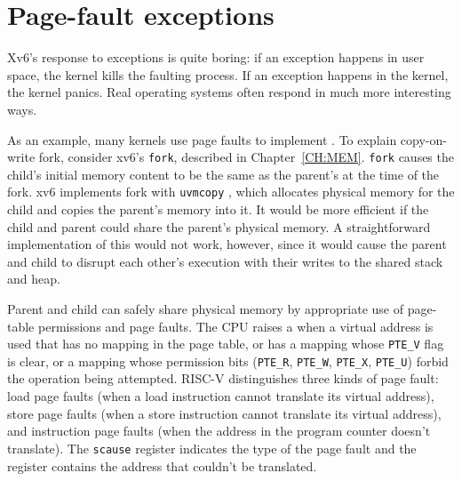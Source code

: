 \section{Page-fault exceptions}
\label{sec:pagefaults}

Xv6's response to exceptions is quite boring: if an exception happens
in user space, the kernel kills the faulting process.  If an
exception happens in the kernel, the kernel panics.  Real operating systems
often respond in much more interesting ways.

As an example,
many kernels use page faults to implement
.
To explain copy-on-write fork, consider xv6's \lstinline{fork},
described in Chapter~\ref{CH:MEM}.
\lstinline{fork} causes the child's initial
memory content to be the same as the parent's at the time of the fork.
xv6 implements fork with
\lstinline{uvmcopy}
,
which allocates physical memory for
the child and copies the parent's memory into it.
It would be more efficient if the child and parent could share 
the parent's physical memory.
A straightforward implementation of this would not work, however,
since it would cause the parent and child to disrupt each other's
execution with their writes to the shared stack and heap.

Parent and child can safely share physical memory by
appropriate use of page-table permissions and page faults.
The CPU raises a
when a virtual address is used that has no mapping
in the page table, or has a mapping whose \lstinline{PTE_V}
flag is clear, or a mapping whose permission bits
(\lstinline{PTE_R},
\lstinline{PTE_W},
\lstinline{PTE_X},
\lstinline{PTE_U})
forbid the operation being attempted.
RISC-V distinguishes three
kinds of page fault: load page faults (when a load instruction cannot
translate its virtual address), store page faults (when a store
instruction cannot translate its virtual address), and instruction
page faults (when the address in the program counter doesn't translate).  The
\lstinline{scause} register indicates the type of the
page fault and the  register contains the address
that couldn't be translated.

